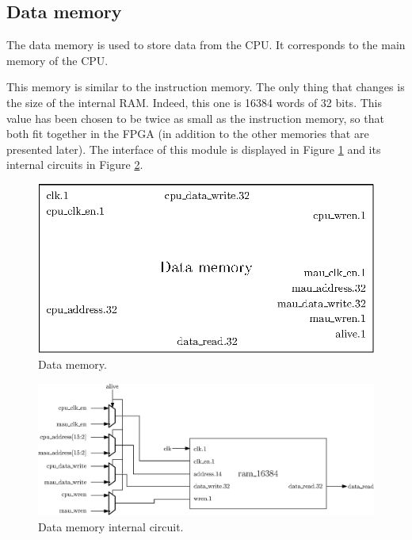 \subsection{Data memory}

The data memory is used to store data from the CPU.  It corresponds to the main memory of the CPU.

This memory is similar to the instruction memory. The only 
thing that changes is the size of the internal RAM. Indeed, this one is 16384 words of 32 bits. This 
value has been chosen to be twice as small as the instruction memory, so that both fit together in 
the FPGA (in addition to the other memories that are presented later). The interface of this module
is displayed in Figure \ref{fig:components/dm} and its internal circuits in Figure \ref{fig:components/dm_in}.

\begin{figure}[H]
    \centering
    \includegraphics[scale=0.8]{Chapter3-CPU/res/data_memory}
    \caption{Data memory.}
    \label{fig:components/dm}
\end{figure}

\begin{figure}[H]
    \centering
    \includegraphics[width=\linewidth]{Chapter3-CPU/res/data_memory_in}
    \caption{Data memory internal circuit.}
    \label{fig:components/dm_in}
\end{figure}

